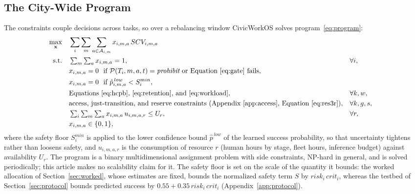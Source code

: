 \documentclass[utf8]{FrontiersinHarvard}
\begin{document}
	\subsection{The City-Wide Program}
	\label{sec:program}

	The constraints couple decisions across tasks, so over a rebalancing window CivicWorkOS solves program~\eqref{eq:program}:
	\begin{subequations}
		\label{eq:program}
		\begin{align}
			\max_{\mathbf{x}} \quad & \sum_{i} \sum_{m} \sum_{a\in\mathcal{A}_{i,m}} x_{i,m,a}\, SCV_{i,m,a}
			\label{eq:prog-obj}\\
			\text{s.t.}\quad
			& \textstyle\sum_{m} \sum_{a} x_{i,m,a} = 1, && \forall i,
			\label{eq:prog-assign}\\
			& x_{i,m,a} = 0 \ \text{ if } \mathcal{P}(T_i,m,a,t)=\textit{prohibit}\ \text{or Equation~\eqref{eq:gate} fails},
			\label{eq:prog-policy}\\
			& x_{i,m,a} = 0 \ \text{ if } \hat p^{\,low}_{i,m,a} < S^{min}_i,
			\label{eq:prog-safety}\\
			& \text{Equations~\eqref{eq:hcpb}, \eqref{eq:retention}, and~\eqref{eq:workload}}, && \forall k,w,
			\label{eq:prog-hcpb}\\
			& \text{access, just-transition, and reserve constraints (Appendix~\ref{app:access}, Equation~\eqref{eq:res3r})}, && \forall k,g,s,
			\label{eq:prog-access}\\
			& \textstyle\sum_{i}\sum_{m}\sum_{a} x_{i,m,a}\, u_{i,m,a,r} \leq U_r, && \forall r,
			\label{eq:prog-cap}\\
			& x_{i,m,a} \in \{0,1\},
			\label{eq:prog-int}
		\end{align}
	\end{subequations}
	where the safety floor $S^{min}_i$ is applied to the lower confidence bound $\hat p^{\,low}$ of the learned success probability, so that uncertainty tightens rather than loosens safety, and $u_{i,m,a,r}$ is the consumption of resource $r$ (human hours by stage, fleet hours, inference budget) against availability $U_r$. The program is a binary multidimensional assignment problem with side constraints, NP-hard in general, and is solved periodically; this article makes no scalability claim for it. The safety floor is set on the scale of the quantity it bounds: the worked allocation of Section~\ref{sec:worked}, whose estimates are fixed, bounds the normalized safety term $S$ by $risk_i\,crit_i$, whereas the testbed of Section~\ref{sec:protocol} bounds predicted success by $0.55+0.35\,risk_i\,crit_i$ (Appendix~\ref{app:protocol}).
\end{document}
